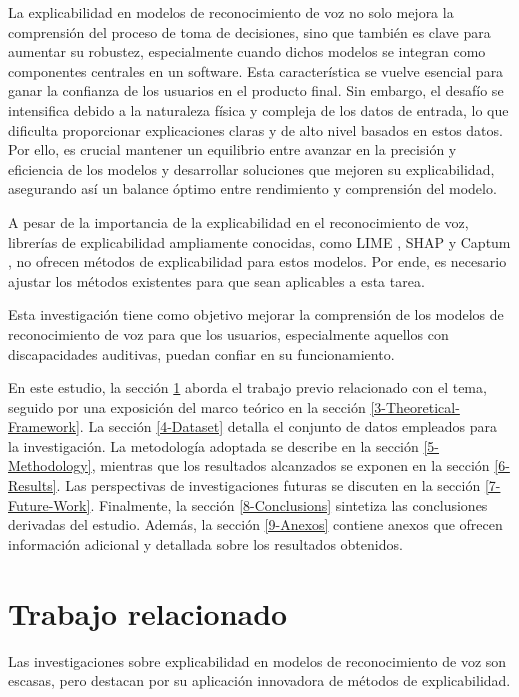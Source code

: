 \documentclass[conference]{IEEEtran}
\begin{document}
La explicabilidad en modelos de reconocimiento de voz no solo mejora la comprensión del proceso de toma de decisiones, sino que también es clave para aumentar su robustez, especialmente cuando dichos modelos se integran como componentes centrales en un software. Esta característica se vuelve esencial para ganar la confianza de los usuarios en el producto final. Sin embargo, el desafío se intensifica debido a la naturaleza física y compleja de los datos de entrada, lo que dificulta proporcionar explicaciones claras y de alto nivel basados en estos datos. Por ello, es crucial mantener un equilibrio entre avanzar en la precisión y eficiencia de los modelos y desarrollar soluciones que mejoren su explicabilidad, asegurando así un balance óptimo entre rendimiento y comprensión del modelo.

A pesar de la importancia de la explicabilidad en el reconocimiento de voz, librerías de explicabilidad ampliamente conocidas, como LIME \cite{ribeiro2016why}, SHAP \cite{lundberg2017unified} y Captum \cite{DBLP:journals/corr/abs-2009-07896}, no ofrecen métodos de explicabilidad para estos modelos. Por ende, es necesario ajustar los métodos existentes para que sean aplicables a esta tarea.

Esta investigación tiene como objetivo mejorar la comprensión de los modelos de reconocimiento de voz para que los usuarios, especialmente aquellos con discapacidades auditivas, puedan confiar en su funcionamiento.

En este estudio, la sección \ref{2-Related-Work} aborda el trabajo previo relacionado con el tema, seguido por una exposición del marco teórico en la sección \ref{3-Theoretical-Framework}. La sección \ref{4-Dataset} detalla el conjunto de datos empleados para la investigación. La metodología adoptada se describe en la sección \ref{5-Methodology}, mientras que los resultados alcanzados se exponen en la sección \ref{6-Results}. Las perspectivas de investigaciones futuras se discuten en la sección \ref{7-Future-Work}. Finalmente, la sección \ref{8-Conclusions} sintetiza las conclusiones derivadas del estudio. Además, la sección \ref{9-Anexos} contiene anexos que ofrecen información adicional y detallada sobre los resultados obtenidos.

\section{Trabajo relacionado} \label{2-Related-Work}

Las investigaciones sobre explicabilidad en modelos de reconocimiento de voz son escasas, pero destacan por su aplicación innovadora de métodos de explicabilidad.
\end{document}
